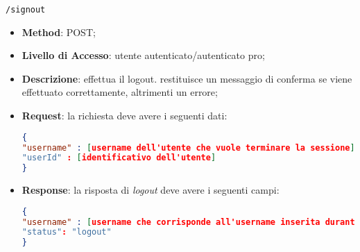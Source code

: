 	\item \texttt{/signout}
		\begin{itemize}
			\item \textbf{Method}: POST;
			\item \textbf{Livello di Accesso}: utente autenticato/autenticato pro;
			\item \textbf{Descrizione}: effettua il logout. restituisce un messaggio di conferma se viene effettuato correttamente, altrimenti un errore;
			\item \textbf{Request}: la richiesta deve avere i seguenti dati:
\begin{lstlisting}[language=json,firstnumber=1]
{
"username" : [username dell'utente che vuole terminare la sessione]
"userId" : [identificativo dell'utente]
}
\end{lstlisting}
			\item \textbf{Response}: la risposta di \textit{logout} deve avere i seguenti campi:
\begin{lstlisting}[language=json,firstnumber=1]
{
"username" : [username che corrisponde all'username inserita durante la registrazione]
"status": "logout"
}
\end{lstlisting}
		\end{itemize}